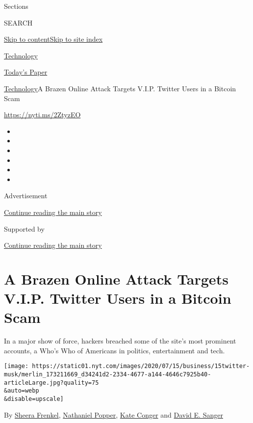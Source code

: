 Sections

SEARCH

\protect\hyperlink{site-content}{Skip to
content}\protect\hyperlink{site-index}{Skip to site index}

\href{https://www.nytimes.com/section/technology}{Technology}

\href{https://myaccount.nytimes.com/auth/login?response_type=cookie\&client_id=vi}{}

\href{https://www.nytimes.com/section/todayspaper}{Today's Paper}

\href{/section/technology}{Technology}\textbar{}A Brazen Online Attack
Targets V.I.P. Twitter Users in a Bitcoin Scam

\url{https://nyti.ms/2ZtyzEO}

\begin{itemize}
\item
\item
\item
\item
\item
\item
\end{itemize}

Advertisement

\protect\hyperlink{after-top}{Continue reading the main story}

Supported by

\protect\hyperlink{after-sponsor}{Continue reading the main story}

\hypertarget{a-brazen-online-attack-targets-vip-twitter-users-in-a-bitcoin-scam}{%
\section{A Brazen Online Attack Targets V.I.P. Twitter Users in a
Bitcoin
Scam}\label{a-brazen-online-attack-targets-vip-twitter-users-in-a-bitcoin-scam}}

In a major show of force, hackers breached some of the site's most
prominent accounts, a Who's Who of Americans in politics, entertainment
and tech.

\texttt{[image: https://static01.nyt.com/images/2020/07/15/business/15twitter-musk/merlin\_173211669\_d34241d2-2334-4677-a144-4646c7925b40-articleLarge.jpg?quality=75\\\&auto=webp\\\&disable=upscale]}

By \href{https://www.nytimes.com/by/sheera-frenkel}{Sheera Frenkel},
\href{https://www.nytimes.com/by/nathaniel-popper}{Nathaniel Popper},
\href{https://www.nytimes.com/by/kate-conger}{Kate Conger} and
\href{https://www.nytimes.com/by/david-e-sanger}{David E. Sanger}

